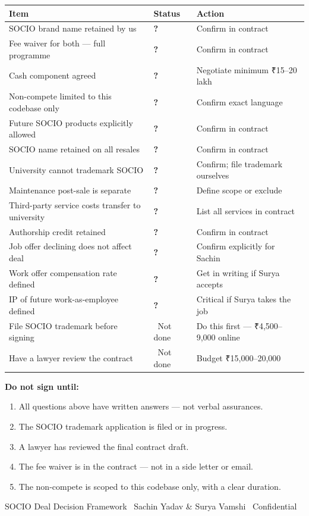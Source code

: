\documentclass[12pt,a4paper]{article}
\newcommand{\no}{\textcolor{red}{\textbf{\texttimes}}}
\newcommand{\ask}{\textcolor{amber}{\textbf{?}}}
\begin{document}
\begin{tabularx}{\textwidth}{L{7cm} L{1.5cm} X}
\toprule
{}
\textbf{Item} & \textbf{Status} & \textbf{Action} \\
\midrule
SOCIO brand name retained by us & \ask & Confirm in contract \\
Fee waiver for both — full programme & \ask & Confirm in contract \\
Cash component agreed & \ask & Negotiate minimum ₹15–20 lakh \\
Non-compete limited to this codebase only & \ask & Confirm exact language \\
Future SOCIO products explicitly allowed & \ask & Confirm in contract \\
SOCIO name retained on all resales & \ask & Confirm in contract \\
University cannot trademark SOCIO & \ask & Confirm; file trademark ourselves \\
Maintenance post-sale is separate & \ask & Define scope or exclude \\
Third-party service costs transfer to university & \ask & List all services in contract \\
Authorship credit retained & \ask & Confirm in contract \\
Job offer declining does not affect deal & \ask & Confirm explicitly for Sachin \\
Work offer compensation rate defined & \ask & Get in writing if Surya accepts \\
IP of future work-as-employee defined & \ask & Critical if Surya takes the job \\
\midrule
{}
File SOCIO trademark before signing & \no\ Not done & Do this first — ₹4,500–9,000 online \\
Have a lawyer review the contract & \no\ Not done & Budget ₹15,000–20,000 \\
\bottomrule
\end{tabularx}

\vspace{0.8cm}

\begin{cannotbox}
\textbf{\color{red} Do not sign until:}
\begin{enumerate}[leftmargin=*, noitemsep]
    \item All questions above have written answers — not verbal assurances.
    \item The SOCIO trademark application is filed or in progress.
    \item A lawyer has reviewed the final contract draft.
    \item The fee waiver is in the contract — not in a side letter or email.
    \item The non-compete is scoped to this codebase only, with a clear duration.
\end{enumerate}
\end{cannotbox}

\vspace{1cm}
\begin{center}
{\small\color{darkgray} SOCIO Deal Decision Framework \textbullet\ Sachin Yadav \& Surya Vamshi \textbullet\ Confidential}
\end{center}
\end{document}
